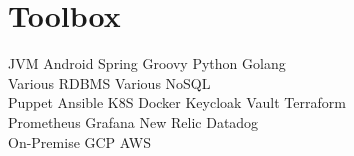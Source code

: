 \documentclass[]{resume}
\begin{document}
\begin{minipage}[t]{0.32\textwidth}

\section{Toolbox}
JVM\textbullet{} Android \textbullet{} Spring \textbullet{} Groovy \textbullet{} Python \textbullet{} Golang \\
Various RDBMS \textbullet{} Various NoSQL\\
Puppet \textbullet{} Ansible \textbullet{} K8S \textbullet{} Docker \textbullet{} Keycloak \textbullet{} Vault \textbullet{} Terraform\\
Prometheus \textbullet{} Grafana \textbullet{} New Relic \textbullet{} Datadog \\
On-Premise \textbullet{} GCP \textbullet{} AWS \\
\sectionsep

%
%

\end{minipage} 
\hfill
\end{document}
